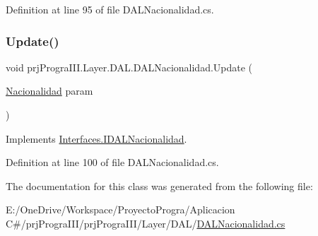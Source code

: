 Definition at line 95 of file D\+A\+L\+Nacionalidad.\+cs.

\hypertarget{classprj_progra_i_i_i_1_1_layer_1_1_d_a_l_1_1_d_a_l_nacionalidad_a3aef21dd2b5393e3d17501bdc60d589b}{}\label{classprj_progra_i_i_i_1_1_layer_1_1_d_a_l_1_1_d_a_l_nacionalidad_a3aef21dd2b5393e3d17501bdc60d589b} 
\subsubsection{\texorpdfstring{Update()}{Update()}}
{\footnotesize\ttfamily void prj\+Progra\+I\+I\+I.\+Layer.\+D\+A\+L.\+D\+A\+L\+Nacionalidad.\+Update (\begin{DoxyParamCaption}\item[{\hyperlink{classprj_progra_i_i_i_1_1_layer_1_1_entities_1_1_nacionalidad}{Nacionalidad}}]{param }\end{DoxyParamCaption})}



Implements \hyperlink{interface_interfaces_1_1_i_d_a_l_nacionalidad_ac0258a3e5e7bd4ea6a212ad5acf513da}{Interfaces.\+I\+D\+A\+L\+Nacionalidad}.



Definition at line 100 of file D\+A\+L\+Nacionalidad.\+cs.



The documentation for this class was generated from the following file\+:\begin{DoxyCompactItemize}
\item 
E\+:/\+One\+Drive/\+Workspace/\+Proyecto\+Progra/\+Aplicacion C\#/prj\+Progra\+I\+I\+I/prj\+Progra\+I\+I\+I/\+Layer/\+D\+A\+L/\hyperlink{_d_a_l_nacionalidad_8cs}{D\+A\+L\+Nacionalidad.\+cs}\end{DoxyCompactItemize}

